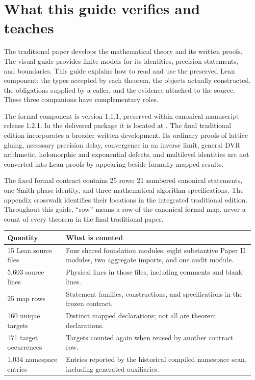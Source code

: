 \section{What this guide verifies and teaches}\label{sec:orientation}

The traditional paper develops the mathematical theory and its written proofs. The visual guide provides finite models for its identities, precision statements, and boundaries. This guide explains how to read and use the preserved Lean component: the types accepted by each theorem, the objects actually constructed, the obligations supplied by a caller, and the evidence attached to the source. These three companions have complementary roles.

The formal component is version 1.1.1, preserved within canonical manuscript release 1.2.1. In the delivered package it is located at . The final traditional edition incorporates a broader written development. Its ordinary proofs of lattice gluing, necessary precision delay, convergence in an inverse limit, general DVR arithmetic, holomorphic and exponential defects, and multilevel identities are not converted into Lean proofs by appearing beside formally mapped results.

The fixed formal contract contains 25 rows: 21 numbered canonical statements, one Smith phase identity, and three mathematical algorithm specifications. The appendix crosswalk identifies their locations in the integrated traditional edition. Throughout this guide, ``row'' means a row of the canonical formal map, never a count of every theorem in the final traditional paper.

\begin{tabular}{p{}p{}}
\toprule Quantity & What is counted \\\midrule
15 Lean source files & Four shared foundation modules, eight substantive Paper II modules, two aggregate imports, and one audit module. \\
5,603 source lines & Physical lines in those files, including comments and blank lines. \\
25 map rows & Statement families, constructions, and specifications in the frozen contract. \\
160 unique targets & Distinct mapped declarations; not all are theorem declarations. \\
171 target occurrences & Targets counted again when reused by another contract row. \\
1,034 namespace entries & Entries reported by the historical compiled namespace scan, including generated auxiliaries. \\
\bottomrule
\end{tabular}

